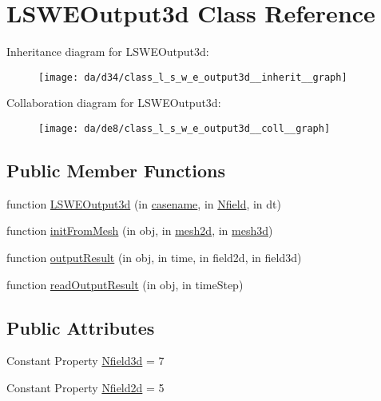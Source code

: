 \hypertarget{class_l_s_w_e_output3d}{}\section{L\+S\+W\+E\+Output3d Class Reference}
\label{class_l_s_w_e_output3d}


Inheritance diagram for L\+S\+W\+E\+Output3d\+:
\nopagebreak
\begin{figure}[H]
\begin{center}
\leavevmode
\texttt{[image: da/d34/class\_l\_s\_w\_e\_output3d\_\_inherit\_\_graph]}
\end{center}
\end{figure}


Collaboration diagram for L\+S\+W\+E\+Output3d\+:
\nopagebreak
\begin{figure}[H]
\begin{center}
\leavevmode
\texttt{[image: da/de8/class\_l\_s\_w\_e\_output3d\_\_coll\_\_graph]}
\end{center}
\end{figure}
\subsection*{Public Member Functions}
\begin{DoxyCompactItemize}
\item 
function \hyperlink{class_l_s_w_e_output3d_a1a59a04276847fd7ae1eb934dda5efec}{L\+S\+W\+E\+Output3d} (in \hyperlink{class_abstract_output_file_a84df82b3a07c6e5eb1f92f21a74fa1e4}{casename}, in \hyperlink{class_abstract_output_file_afdf632429d019dff27d7f29102512101}{Nfield}, in dt)
\item 
function \hyperlink{class_l_s_w_e_output3d_aa2e60d47048ed8be35e75eed0f93b8ef}{init\+From\+Mesh} (in obj, in \hyperlink{class_l_s_w_e_output3d_abed2820df76b9d163d5f817d8195ef5f}{mesh2d}, in \hyperlink{class_l_s_w_e_output3d_a88093239f10c744f1748234c4f465828}{mesh3d})
\item 
function \hyperlink{class_l_s_w_e_output3d_a8b51b1257088779d613606c428726868}{output\+Result} (in obj, in time, in field2d, in field3d)
\item 
function \hyperlink{class_l_s_w_e_output3d_a7fa2b397893d9609ba9007e7ee103648}{read\+Output\+Result} (in obj, in time\+Step)
\end{DoxyCompactItemize}
\subsection*{Public Attributes}
\begin{DoxyCompactItemize}
\item 
Constant Property \hyperlink{class_l_s_w_e_output3d_ac9e3bd7e41becfb93c18fe78d7b77e5f}{Nfield3d} = 7
\item 
Constant Property \hyperlink{class_l_s_w_e_output3d_a9253e1bcd43a309440e3f5d871da732e}{Nfield2d} = 5
\end{DoxyCompactItemize}
